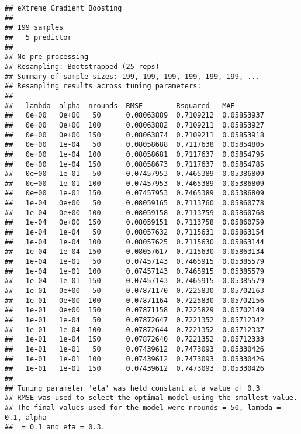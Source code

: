 \documentclass[11pt,]{article}
\newenvironment{Shaded}{\begin{snugshade}}{\end{snugshade}}
\newcommand{\NormalTok}[1]{#1}
\newcommand{\OperatorTok}[1]{\textcolor[rgb]{0.81,0.36,0.00}{\textbf{#1}}}
\begin{document}
\begin{Shaded}
\end{Shaded}

\begin{verbatim}
## eXtreme Gradient Boosting 
## 
## 199 samples
##   5 predictor
## 
## No pre-processing
## Resampling: Bootstrapped (25 reps) 
## Summary of sample sizes: 199, 199, 199, 199, 199, 199, ... 
## Resampling results across tuning parameters:
## 
##   lambda  alpha  nrounds  RMSE        Rsquared   MAE       
##   0e+00   0e+00   50      0.08063889  0.7109212  0.05853937
##   0e+00   0e+00  100      0.08063882  0.7109211  0.05853927
##   0e+00   0e+00  150      0.08063874  0.7109211  0.05853918
##   0e+00   1e-04   50      0.08058688  0.7117638  0.05854805
##   0e+00   1e-04  100      0.08058681  0.7117637  0.05854795
##   0e+00   1e-04  150      0.08058673  0.7117637  0.05854785
##   0e+00   1e-01   50      0.07457953  0.7465389  0.05386809
##   0e+00   1e-01  100      0.07457953  0.7465389  0.05386809
##   0e+00   1e-01  150      0.07457953  0.7465389  0.05386809
##   1e-04   0e+00   50      0.08059165  0.7113760  0.05860778
##   1e-04   0e+00  100      0.08059158  0.7113759  0.05860768
##   1e-04   0e+00  150      0.08059151  0.7113758  0.05860759
##   1e-04   1e-04   50      0.08057632  0.7115631  0.05863154
##   1e-04   1e-04  100      0.08057625  0.7115630  0.05863144
##   1e-04   1e-04  150      0.08057617  0.7115630  0.05863134
##   1e-04   1e-01   50      0.07457143  0.7465915  0.05385579
##   1e-04   1e-01  100      0.07457143  0.7465915  0.05385579
##   1e-04   1e-01  150      0.07457143  0.7465915  0.05385579
##   1e-01   0e+00   50      0.07871170  0.7225830  0.05702163
##   1e-01   0e+00  100      0.07871164  0.7225830  0.05702156
##   1e-01   0e+00  150      0.07871158  0.7225829  0.05702149
##   1e-01   1e-04   50      0.07872647  0.7221352  0.05712342
##   1e-01   1e-04  100      0.07872644  0.7221352  0.05712337
##   1e-01   1e-04  150      0.07872640  0.7221352  0.05712333
##   1e-01   1e-01   50      0.07439612  0.7473093  0.05330426
##   1e-01   1e-01  100      0.07439612  0.7473093  0.05330426
##   1e-01   1e-01  150      0.07439612  0.7473093  0.05330426
## 
## Tuning parameter 'eta' was held constant at a value of 0.3
## RMSE was used to select the optimal model using the smallest value.
## The final values used for the model were nrounds = 50, lambda = 0.1, alpha
##  = 0.1 and eta = 0.3.
\end{verbatim}
\end{document}
